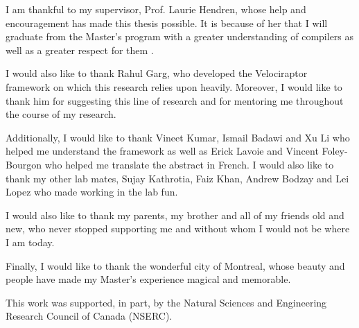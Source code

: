 I am thankful to my supervisor, Prof. Laurie Hendren, whose help and encouragement has made this thesis possible. It is because of her that I will graduate from the Master's program with a greater understanding  of compilers as well as a greater respect for them . 

I would also like to thank Rahul Garg, who developed the Velociraptor framework on which this research relies upon heavily. Moreover, I would like to thank him for suggesting this line of research and for mentoring me throughout the course of my research. 

Additionally, I would like to thank Vineet Kumar, Ismail Badawi and Xu Li who helped me understand the \mclab framework as well as Erick Lavoie and Vincent Foley-Bourgon who helped me translate the abstract in French. I would also like to thank my other lab mates, Sujay Kathrotia, Faiz Khan, Andrew Bodzay and Lei Lopez who made working in the lab fun. 

I would also like to thank my parents, my brother and all of my friends old and new, who never stopped supporting me and without whom I would not be where I am today.

Finally, I would like to thank the wonderful city of Montreal, whose beauty and people have made my Master's experience magical and memorable. 

This work was supported, in part, by the Natural Sciences and Engineering Research
Council of Canada (NSERC).
